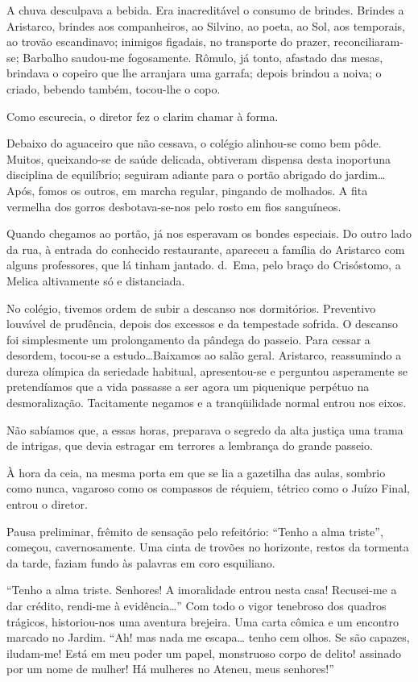 A chuva desculpava a bebida.
Era inacreditável o consumo de brindes. Brindes a Aristarco, brindes
aos companheiros, ao Silvino, ao poeta, ao Sol, aos temporais, ao
trovão escandinavo; inimigos figadais, no transporte do prazer,
reconciliaram{}-se; Barbalho saudou{}-me fogosamente. Rômulo, já tonto,
afastado das mesas, brindava o copeiro que lhe arranjara uma garrafa;
depois brindou a noiva; o criado, bebendo também, tocou{}-lhe o copo.

Como escurecia, o diretor fez o clarim chamar à forma. 

Debaixo do aguaceiro que não cessava, o colégio alinhou{}-se como bem pôde.
Muitos, queixando{}-se de saúde delicada, obtiveram dispensa desta
inoportuna disciplina de equilíbrio; seguiram adiante para o portão
abrigado do jardim\ldots Após, fomos os outros, em marcha regular,
pingando de molhados. A fita vermelha dos gorros desbotava{}-se{}-nos
pelo rosto em fios sanguíneos. 

Quando chegamos ao portão, já nos
esperavam os bondes especiais. Do outro lado da rua, à entrada do
conhecido restaurante, apareceu a família do Aristarco com alguns
professores, que lá tinham jantado. d.~Ema, pelo braço do Crisóstomo, a
Melica altivamente só e distanciada. 

No colégio, tivemos ordem de subir
a descanso nos dormitórios. Preventivo louvável de prudência, depois
dos excessos e da tempestade sofrida. O descanso foi simplesmente um
prolongamento da pândega do passeio. Para cessar a desordem, tocou{}-se
a estudo\ldots Baixamos ao salão geral. Aristarco, reassumindo a dureza
olímpica da seriedade habitual, apresentou{}-se e perguntou asperamente
se pretendíamos que a vida passasse a ser agora um piquenique perpétuo
na desmoralização. Tacitamente negamos e a tranqüilidade normal entrou
nos eixos. 

Não sabíamos que, a essas horas, preparava o segredo da alta
justiça uma trama de intrigas, que devia estragar em terrores a
lembrança do grande passeio. 

À hora da ceia, na mesma porta em que se
lia a gazetilha das aulas, sombrio como nunca, vagaroso como os
compassos de réquiem, tétrico como o Juízo Final, entrou o diretor.

Pausa preliminar, frêmito de sensação pelo refeitório: ``Tenho a alma
triste'', começou, cavernosamente. Uma cinta de trovões no 
horizonte, restos da tormenta da
tarde, faziam fundo às palavras em coro esquiliano. 

``Tenho a alma triste. Senhores! A imoralidade entrou nesta casa! 
Recusei{}-me a dar crédito, rendi{}-me à evidência\ldots'' 
Com todo o vigor tenebroso dos
quadros trágicos, historiou{}-nos uma aventura brejeira. Uma carta
cômica e um encontro marcado no Jardim. ``Ah! mas nada me escapa\ldots
tenho cem olhos. Se são capazes, iludam{}-me! Está em meu poder um
papel, monstruoso corpo de delito! assinado por um nome de mulher! Há
mulheres no Ateneu, meus senhores!'' 

